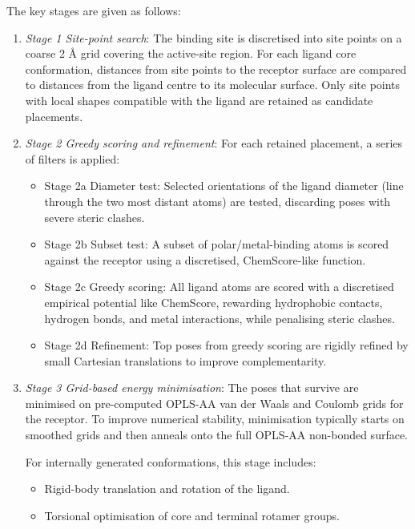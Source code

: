 \documentclass[12pt]{article}
\begin{document}
The key stages are given as follows:
\begin{enumerate}
  \item \emph{Stage 1 Site-point search}: The binding site is discretised into site points on a coarse 2 \r{A} grid covering the active-site region. For each ligand core conformation, distances from site points to the receptor surface are compared to distances from the ligand centre to its molecular surface. Only site points with local shapes compatible with the ligand are retained as candidate placements.

  \item \emph{Stage 2 Greedy scoring and refinement}: For each retained placement, a series of filters is applied:
    \begin{itemize}
      \item Stage 2a Diameter test: Selected orientations of the ligand diameter (line through the two most distant atoms) are tested, discarding poses with severe steric clashes.
      \item Stage 2b Subset test: A subset of polar/metal-binding atoms is scored against the receptor using a discretised, ChemScore-like function.
      \item Stage 2c Greedy scoring: All ligand atoms are scored with a discretised empirical potential like ChemScore, rewarding hydrophobic contacts, hydrogen bonds, and metal interactions, while penalising steric clashes.
      \item Stage 2d Refinement: Top poses from greedy scoring are rigidly refined by small Cartesian translations to improve complementarity.
    \end{itemize}

  \item \emph{Stage 3 Grid-based energy minimisation}: The poses that survive are minimised on pre-computed OPLS-AA van der Waals and Coulomb grids for the receptor. To improve numerical stability, minimisation typically starts on smoothed grids and then anneals onto the full OPLS-AA non-bonded surface.

  For internally generated conformations, this stage includes:
    \begin{itemize}
      \item Rigid-body translation and rotation of the ligand.
      \item Torsional optimisation of core and terminal rotamer groups.
    \end{itemize}


\end{enumerate}
\end{document}
